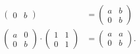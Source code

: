 \begin{loes}
\begin{align*}
\begin{pmatrix}
	0 & b
	\end{pmatrix}
	&= 
	\begin{pmatrix}
	a & b \\
	0 & b
	\end{pmatrix}
	\\
	\begin{pmatrix}
	a & 0 \\
	0 & b
	\end{pmatrix}
	\cdot
	\begin{pmatrix}
	1 & 1 \\
	0 & 1
	\end{pmatrix}
	&= 
	\begin{pmatrix}
	a & a \\
	0 & b
	\end{pmatrix}.
	\end{align*}
\end{loes}

